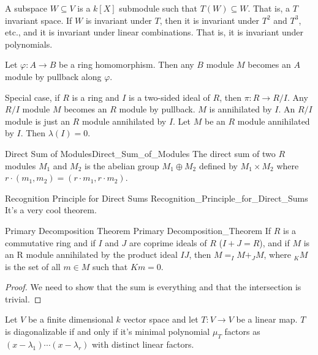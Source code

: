 \documentclass[crop=false,class=book,oneside]{standalone}                  %
\begin{document}
        A subspace $W\subseteq{V}$ is a $k[X]$ submodule such that
        $T(W)\subseteq{W}$. That is, a $T$ invariant space. If $W$ is invariant
        under $T$, then it is invariant under $T^{2}$ and $T^{3}$, etc., and
        it is invariant under linear combinations. That is, it is invariant
        under polynomials.
        \begin{example}
            Let $\varphi:A\rightarrow{B}$ be a ring homomorphism. Then any
            $B$ module $M$ becomes an $A$ module by pullback along $\varphi$.
        \end{example}
        Special case, if $R$ is a ring and $I$ is a two-sided ideal of $R$,
        then $\pi:R\rightarrow{R}/I$. Any $R/I$ module $M$ becomes an
        $R$ module by pullback. $M$ is annihilated by $I$. An $R/I$ module is
        just an $R$ module annihilated by $I$. Let $M$ be an $R$ module
        annihilated by $I$. Then $\lambda(I)=0$.
        \begin{ldefinition}{Direct Sum of Modules}{Direct_Sum_of_Modules}
            The direct sum of two $R$ modules $M_{1}$ and $M_{2}$ is the abelian
            group $M_{1}\oplus{M}_{2}$ defined by $M_{1}\times{M}_{2}$ where
            $r\cdot(m_{1},m_{2})=(r\cdot{m_{1}},r\cdot{m_{2}})$.
        \end{ldefinition}
        \begin{ltheorem}{Recognition Principle for Direct Sums}
                        {Recognition_Principle_for_Direct_Sums}
            It's a very cool theorem.
        \end{ltheorem}
        \begin{ltheorem}{Primary Decomposition Theorem}
                        {Primary Decomposition_Theorem}
            If $R$ is a commutative ring and if $I$ and $J$ are coprime ideals
            of $R$ ($I+J=R$), and if $M$ is an R module annihilated by the
            product ideal $IJ$, then $M=_{I}M+_{J}M$, where
            $_{K}M$ is the set of all $m\in{M}$ such that $Km=0$.
        \end{ltheorem}
        \begin{proof}
            We need to show that the sum is everything and that the intersection
            is trivial.
        \end{proof}
        Let $V$ be a finite dimensional $k$ vector space and let
        $T:V\rightarrow{V}$ be a linear map. $T$ is diagonalizable if and only
        if it's minimal polynomial $\mu_{T}$ factors as
        $(x-\lambda_{1})\cdots(x-\lambda_{r})$ with distinct linear factors.
\end{document}
